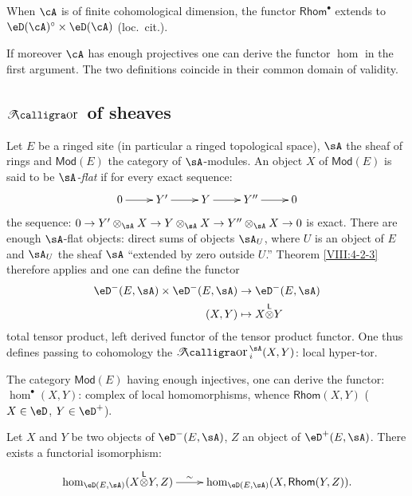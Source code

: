 When $\cA$ is of finite cohomological dimension, the functor
$\mathsf{Rhom}^\bullet$ extends to $\eD(\cA)^\circ\times \eD(\cA)$
(loc.\ cit.).

If moreover $\cA$ has enough projectives one can derive the
functor $\hom$ in the first argument. The two definitions
coincide in their common domain of validity. 










\subsection{\texorpdfstring{$\Tor$}{Tor} of sheaves}\label{VIII:6-2}

Let $E$ be a ringed site (in particular a ringed topological space),
$\sA$ the sheaf of rings and $\mathsf{Mod}(E)$ the category of
$\sA$-modules. An object $X$ of $\mathsf{Mod}(E)$ is said to be
\emph{$\sA$-flat} if for every exact sequence: 
\[\xymatrix{
  0 \ar[r] 
    & Y' \ar[r] 
    & Y \ar[r] 
    & Y'' \ar[r] 
    & 0 
}\]
the sequence: $0 \to Y'\otimes_\sA X \to Y\otimes_\sA X \to Y''\otimes_\sA X\to 0$
is exact. There are enough $\sA$-flat objects: direct sums
of objects $\sA_U$, where $U$ is an object of $E$ and $\sA_U$ the sheaf
$\sA$ ``extended by zero outside $U$.'' Theorem
\ref{VIII:4-2-3} therefore applies and one can define the functor 
\begin{align*}
  \eD^-(E,\sA) \times \eD^-(E,\sA) &\to \eD^-(E,\sA) \\
  (X,Y) &\mapsto X\lotimes Y 
\end{align*}
total tensor product, left derived functor of the tensor product functor.
One thus defines passing to cohomology the $\Tor_i^\sA(X,Y)$:
local hyper-tor.

The category $\mathsf{Mod}(E)$ having enough injectives, one can
derive the functor: $\hom^\bullet(X,Y)$: complex of local homomorphisms,
whence $\mathsf{Rhom}(X,Y)$ ($X\in \eD$, $Y\in \eD^+$).

Let $X$ and $Y$ be two objects of $\eD^-(E,\sA)$, $Z$ an object of
$\eD^+(E,\sA)$. There exists a functorial isomorphism: 
\[\xymatrix{
  \hom_{\eD(E,\sA)}(X\lotimes Y,Z) \ar[r]^-\sim 
    &\hom_{\eD(E,\sA)}(X,\mathsf{Rhom}(Y,Z)) \text{.}
}\]











